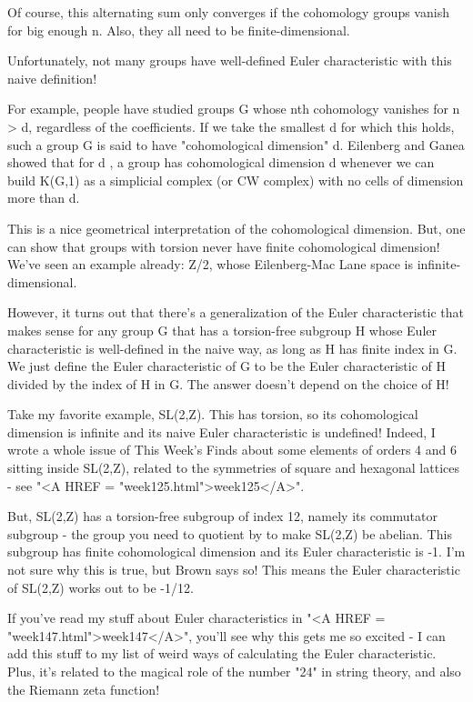 Of course, this alternating sum only converges if the cohomology
groups vanish for big enough n.  Also, they all need to be 
finite-dimensional.

Unfortunately, not many groups have well-defined Euler characteristic
with this naive definition!  

For example, people have studied groups G whose nth cohomology vanishes
for n > d, regardless of the coefficients.  If we take the smallest
d for which this holds, such a group G is said to have "cohomological 
dimension" d.  Eilenberg and Ganea showed that for d , a group has 
cohomological dimension d whenever we can build K(G,1) as a simplicial 
complex (or CW complex) with no cells of dimension more than d.   

This is a nice geometrical interpretation of the cohomological dimension.  
But, one can show that groups with torsion never have finite cohomological
dimension!  We've seen an example already: Z/2, whose Eilenberg-Mac Lane
space is infinite-dimensional.

However, it turns out that there's a generalization of the Euler 
characteristic that makes sense for any group G that has a torsion-free 
subgroup H whose Euler characteristic is well-defined in the naive way, 
as long as H has finite index in G.  We just define the Euler characteristic
of G to be the Euler characteristic of H divided by the index of H in G.
The answer doesn't depend on the choice of H!

Take my favorite example, SL(2,Z).  This has torsion, so its cohomological
dimension is infinite and its naive Euler characteristic is undefined!  
Indeed, I wrote a whole issue of This Week's Finds about some elements of 
orders 4 and 6 sitting inside SL(2,Z), related to the symmetries of square 
and hexagonal lattices - see "<A HREF = "week125.html">week125</A>".   

But, SL(2,Z) has a torsion-free subgroup of index 12, namely its
commutator subgroup - the group you need to quotient by to make SL(2,Z)
be abelian.  This subgroup has finite cohomological dimension and its
Euler characteristic is -1.  I'm not sure why this is true, but Brown says
so!  This means the Euler characteristic of SL(2,Z) works out to be -1/12.  

If you've read my stuff about Euler characteristics in "<A HREF = "week147.html">week147</A>", you'll
see why this gets me so excited - I can add this stuff to my list of
weird ways of calculating the Euler characteristic.  Plus, it's related 
to the magical role of the number "24" in string theory, and also the 
Riemann zeta function!

